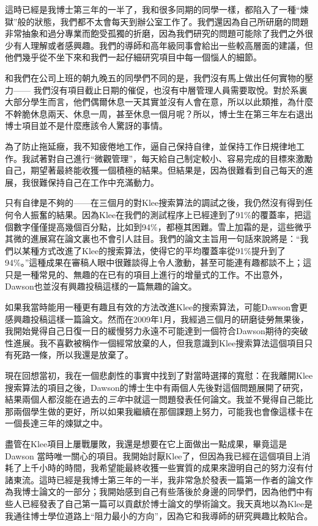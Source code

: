 \documentclass[12pt,UTF8,nofonts]{book}
\begin{document}
這時已經是我博士第三年的一半了，我和很多同期的同學一樣，都陷入了一種“煉獄”般的狀態，我們都不太會每天到辦公室工作了。我們還因為自己所研磨的問題非常抽象和過分專業而飽受孤獨的折磨，因為我們研究的問題可能除了我們之外很少有人理解或者感興趣。我們的導師和高年級同事會給出一些較高層面的建議，但他們幾乎從不坐下來和我們一起仔細研究項目中每一個惱人的細節。

和我們在公司上班的朝九晚五的同學們不同的是，我們沒有馬上做出任何實物的壓力—— 我們沒有項目截止日期的催促，也沒有中層管理人員需要取悅。對於系裏大部分學生而言，他們偶爾休息一天其實並沒有人會在意，所以以此類推，為什麼不幹脆休息兩天、休息一周，甚至休息一個月呢？所以，博士生在第三年左右退出博士項目並不是什麼應該令人驚訝的事情。

為了防止拖延癥，我不知疲倦地工作，逼自己保持自律，並保持工作日規律地工作。我試著對自己進行“微觀管理”，每天給自己制定較小、容易完成的目標來激勵自己，期望著最終能收獲一個積極的結果。但結果是，因為很難看到自己每天的進展，我很難保持自己在工作中充滿動力。

只有自律是不夠的——在三個月的對Klee搜索算法的調試之後，我仍然沒有得到任何令人振奮的結果。因為Klee在我們的測試程序上已經達到了91\%的覆蓋率，把這個數字僅僅提高幾個百分點，比如到94\%，都極其困難。雪上加霜的是，這些微乎其微的進展寫在論文裏也不會引人註目。我們的論文主旨用一句話來說將是：“我們以某種方式改進了Klee的搜索算法，使得它的平均覆蓋率從91\%提升到了94\%。”這種成果在審稿人眼中很難談得上令人激動，甚至可能連有趣都談不上；這只是一種常見的、無趣的在已有的項目上進行的增量式的工作。不出意外，Dawson也並沒有興趣投稿這樣的一篇無趣的論文。

如果我當時能用一種更有趣且有效的方法改進Klee的搜索算法，可能Dawson會更感興趣投稿這樣一篇論文。然而在2009年1月，我經過三個月的研磨徒勞無果後，我開始覺得自己日復一日的緩慢努力永遠不可能達到一個符合Dawson期待的突破性進展。我不喜歡被稱作一個經常放棄的人，但我意識到Klee搜索算法這個項目只有死路一條，所以我還是放棄了。

現在回想當初，我在一個悲劇性的事實中找到了對當時選擇的寬慰：在我離開Klee 搜索算法的項目之後，Dawson的博士生中有兩個人先後對這個問題展開了研究，結果兩個人都沒能在過去的\emph{三年}中就這一問題發表任何論文。我並不覺得自己能比那兩個學生做的更好，所以如果我繼續在那個課題上努力，可能我也會像這樣卡在一個長達三年的煉獄之中。

\breakline

盡管在Klee項目上屢戰屢敗，我還是想要在它上面做出一點成果，畢竟這是Dawson 當時唯一關心的項目。我開始討厭Klee了，但因為我已經在這個項目上消耗了上千小時的時間，我希望能最終收獲一些實質的成果來證明自己的努力沒有付諸東流。這時已經是我博士第三年的一半，我非常急於發表一篇第一作者的論文作為我博士論文的一部分；我開始感到自己有些落後於身邊的同學們，因為他們中有些人已經發表了自己第一篇可以貢獻於博士論文的學術論文。我天真地以為Klee是我通往博士學位道路上“阻力最小的方向”，因為它和我導師的研究興趣比較貼合。
\end{document}
